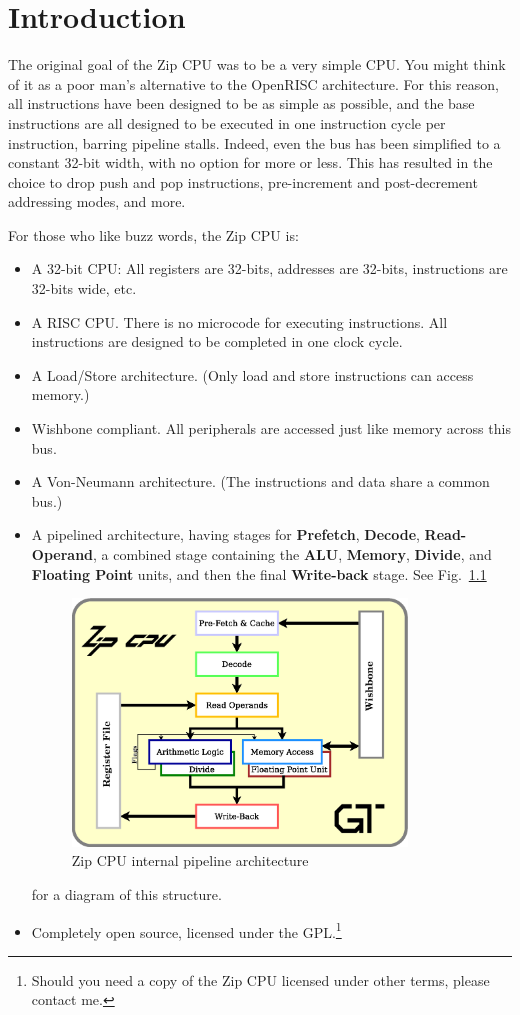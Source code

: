 \documentclass{gqtekspec}
\begin{document}
\chapter{Introduction}
\setcounter{page}{1}


The original goal of the Zip CPU was to be a very simple CPU.   You might
think of it as a poor man's alternative to the OpenRISC architecture.
For this reason, all instructions have been designed to be as simple as
possible, and the base instructions are all designed to be executed in one
instruction cycle per instruction, barring pipeline stalls.  Indeed, even the
bus has been simplified to a constant 32-bit width, with no option for more
or less.  This has resulted in the choice to drop push and pop instructions,
pre-increment and post-decrement addressing modes, and more.

For those who like buzz words, the Zip CPU is:
\begin{itemize}
\item A 32-bit CPU: All registers are 32-bits, addresses are 32-bits,
		instructions are 32-bits wide, etc.
\item A RISC CPU.  There is no microcode for executing instructions.  All
	instructions are designed to be completed in one clock cycle.
\item A Load/Store architecture.  (Only load and store instructions
		can access memory.)
\item Wishbone compliant.  All peripherals are accessed just like
		memory across this bus.
\item A Von-Neumann architecture.  (The instructions and data share a 
		common bus.)
\item A pipelined architecture, having stages for {\bf Prefetch},
		{\bf Decode}, {\bf Read-Operand}, a
		combined stage containing the {\bf ALU},
		{\bf Memory}, {\bf Divide}, and {\bf Floating Point}
		units, and then the final {\bf Write-back} stage. 
		See Fig.~\ref{fig:cpu}
\begin{figure}\begin{center}
\includegraphics[width=3.5in]{../gfx/cpu.eps}
\caption{Zip CPU internal pipeline architecture}\label{fig:cpu}
\end{center}\end{figure}
		for a diagram of this structure.
\item Completely open source, licensed under the GPL.\footnote{Should you
	need a copy of the Zip CPU licensed under other terms, please 
	contact me.}
\end{itemize}
\end{document}
